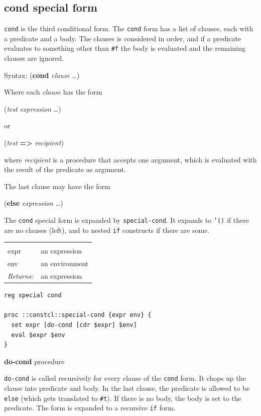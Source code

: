 \documentclass[twoside,9pt]{report}
\begin{document}
\subsection{cond special form}
\label{cond-special-form}


\texttt{cond} is the third conditional form. The \texttt{cond} form has a list of clauses, each with a predicate and a body. The clauses is considered in order, and if a predicate evaluates to something other than \texttt{\#f} the body is evaluated and the remaining clauses are ignored.



Syntax: (\textbf{cond} \emph{clause} \ldots )


Where each \emph{clause} has the form


(\emph{test} \emph{expression} \ldots )


or


(\emph{test} \textbf{=>} \emph{recipient})


where \emph{recipient} is a procedure that accepts one argument, which is evaluated with the result of the predicate as argument.


The last clause may have the form


(\textbf{else} \emph{expression} \ldots )


The \texttt{cond} special form is expanded by \texttt{special-cond}. It expands to \texttt{'()} if there are no clauses (left), and to nested \texttt{if} constructs if there are some.

\noindent\begin{tabular}{ |p{1.9cm} p{8cm}| }
\hline
\rowcolor[HTML]{CCCCCC} \multicolumn{2}{|l|}{\bf special-cond (internal)} \\
expr & an expression \\
env & an environment \\
\textit{Returns:} & an expression \\
\hline
\end{tabular}
\begin{lstlisting}
reg special cond

proc ::constcl::special-cond {expr env} {
  set expr [do-cond [cdr $expr] $env]
  eval $expr $env
}
\end{lstlisting}


\textbf{do-cond} procedure


\texttt{do-cond} is called recursively for every clause of the \texttt{cond} form. It chops up the clause into predicate and body. In the last clause, the predicate is allowed to be \texttt{else} (which gets translated to \texttt{\#t}). If there is no body, the body is set to the predicate. The form is expanded to a recursive \texttt{if} form.
\end{document}
